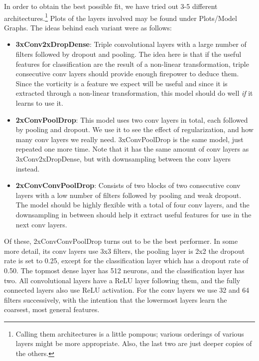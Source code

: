 \documentclass[]{article}
\begin{document}
In order to obtain the best possible fit, we have tried out 3-5 different architectures.\footnote{Calling them architectures is a little pompous; various orderings of various layers might be more appropriate. Also, the last two are just deeper copies of the others.} Plots of the layers involved may be found under Plots/Model Graphs. The ideas behind each variant were as follows:
\begin{itemize}
	\item[1)] \textbf{3xConv2xDropDense}: Triple convolutional layers with a large number of filters followed by dropout and pooling. The idea here is that if the useful features for classification are the result of a non-linear transformation, triple consecutive conv layers should provide enough firepower to deduce them. Since the vorticity is a feature we expect will be useful and since it is extracted through a non-linear transformation, this model should do well \textit{if} it learns to use it.
	
	\item[2)] \textbf{2xConvPoolDrop}: This model uses two conv layers in total, each followed by pooling and dropout. We use it to see the effect of regularization, and how many conv layers we really need. 3xConvPoolDrop is the same model, just repeated one more time. Note that it has the same amount of conv layers as 3xConv2xDropDense, but with downsampling between the conv layers instead.
	
	\item[3)] \textbf{2xConvConvPoolDrop}: Consists of two blocks of two consecutive conv layers with a low number of filters followed by pooling and weak dropout. The model should be highly flexible with a total of four conv layers, and the downsampling in between should help it extract useful features for use in the next conv layers.
\end{itemize}

Of these, 2xConvConvPoolDrop turns out to be the best performer. In some more detail, its conv layers use 3x3 filters, the pooling layer is 2x2 the dropout rate is set to 0.25, except for the classification layer which has a dropout rate of 0.50. The topmost dense layer has 512 neurons, and the classification layer has two. All convolutional layers have a ReLU layer following them, and the fully connected layers also use ReLU activation. For the conv layers we use 32 and 64 filters successively, with the intention that the lowermost layers learn the coarsest, most general features. 
\end{document}
